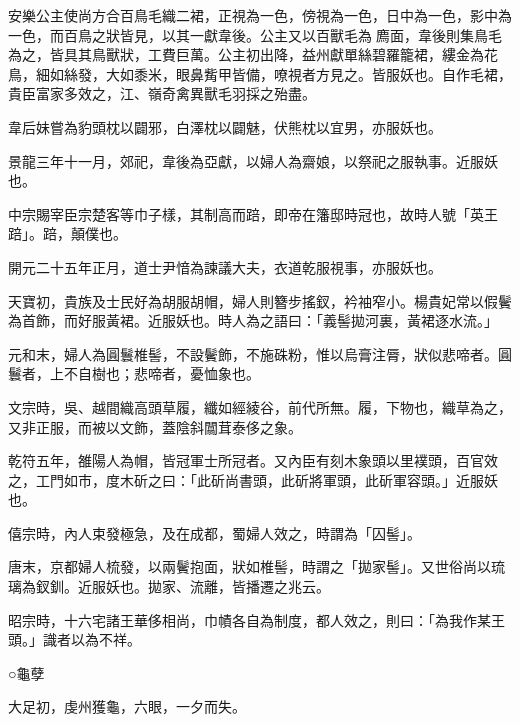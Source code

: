 \begin{pinyinscope}
 安樂公主使尚方合百鳥毛織二裙，正視為一色，傍視為一色，日中為一色，影中為一色，而百鳥之狀皆見，以其一獻韋後。公主又以百獸毛為廌面，韋後則集鳥毛為之，皆具其鳥獸狀，工費巨萬。公主初出降，益州獻單絲碧羅籠裙，縷金為花鳥，細如絲發，大如黍米，眼鼻觜甲皆備，嘹視者方見之。皆服妖也。自作毛裙，貴臣富家多效之，江、嶺奇禽異獸毛羽採之殆盡。



 韋后妹嘗為豹頭枕以闢邪，白澤枕以闢魅，伏熊枕以宜男，亦服妖也。



 景龍三年十一月，郊祀，韋後為亞獻，以婦人為齋娘，以祭祀之服執事。近服妖也。



 中宗賜宰臣宗楚客等巾子樣，其制高而踣，即帝在籓邸時冠也，故時人號「英王踣」。踣，顛僕也。



 開元二十五年正月，道士尹愔為諫議大夫，衣道乾服視事，亦服妖也。



 天寶初，貴族及士民好為胡服胡帽，婦人則簪步搖釵，衿袖窄小。楊貴妃常以假鬢為首飾，而好服黃裙。近服妖也。時人為之語曰：「義髻拋河裏，黃裙逐水流。」



 元和末，婦人為圓鬟椎髻，不設鬢飾，不施硃粉，惟以烏膏注脣，狀似悲啼者。圓鬟者，上不自樹也；悲啼者，憂恤象也。



 文宗時，吳、越間織高頭草履，纖如經綾谷，前代所無。履，下物也，織草為之，又非正服，而被以文飾，蓋陰斜闒茸泰侈之象。



 乾符五年，雒陽人為帽，皆冠軍士所冠者。又內臣有刻木象頭以里襆頭，百官效之，工門如市，度木斫之曰：「此斫尚書頭，此斫將軍頭，此斫軍容頭。」近服妖也。



 僖宗時，內人束發極急，及在成都，蜀婦人效之，時謂為「囚髻」。



 唐末，京都婦人梳發，以兩鬢抱面，狀如椎髻，時謂之「拋家髻」。又世俗尚以琉璃為釵釧。近服妖也。拋家、流離，皆播遷之兆云。



 昭宗時，十六宅諸王華侈相尚，巾幘各自為制度，都人效之，則曰：「為我作某王頭。」識者以為不祥。



 ○龜孽



 大足初，虔州獲龜，六眼，一夕而失。




\end{pinyinscope}
